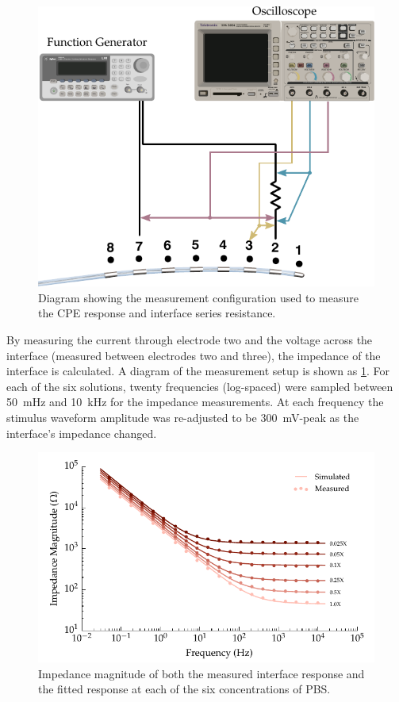       \begin{figure}
          \centering
          \includegraphics[scale=0.95]{content/pt2/08-InterfaceParameters/graphics/measurement_CPE_setup}
          \caption{\label{fig:pt2-measurement_CPE_setup}Diagram showing the measurement configuration used to measure the CPE response and interface series resistance.}
      \end{figure}
      By measuring the current through electrode two and the voltage across the interface (measured between electrodes two and three), the impedance of the interface is calculated.
      A diagram of the measurement setup is shown as \cref{fig:pt2-measurement_CPE_setup}.
      For each of the six solutions, twenty frequencies (log-spaced) were sampled between \SI{50}{\milli\hertz} and \SI{10}{\kilo\hertz} for the impedance measurements.
      At each frequency the stimulus waveform amplitude was re-adjusted to be \SI{300}{\milli\volt}-peak as the interface's impedance changed.
      \begin{figure}
        \centering
        \includegraphics{content/pt2/08-InterfaceParameters/graphics/displacement_impedanceVsFrequency_magnitude_thesis}
        \caption{\label{fig:pt2-graph_impedanceVsFrequency_magnitude}Impedance magnitude of both the measured interface response and the fitted response at each of the six concentrations of PBS.}
      \end{figure}
